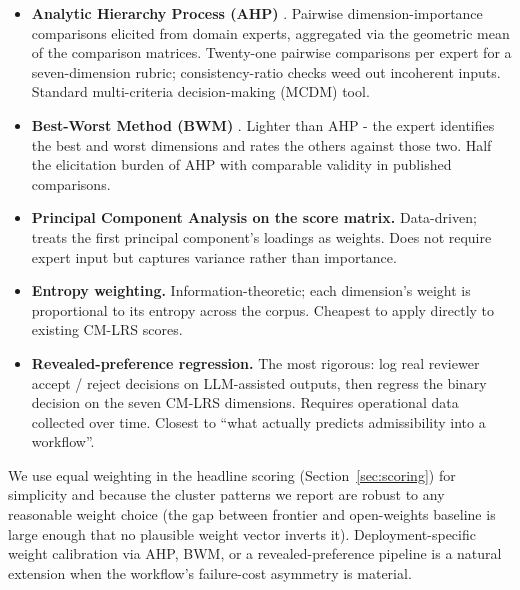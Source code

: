 \documentclass[11pt]{article}
\begin{document}
\begin{itemize}[leftmargin=*,itemsep=0.15em]
\item \textbf{Analytic Hierarchy Process (AHP)} \citep{saaty1980ahp}. Pairwise dimension-importance comparisons elicited from domain experts, aggregated via the geometric mean of the comparison matrices. Twenty-one pairwise comparisons per expert for a seven-dimension rubric; consistency-ratio checks weed out incoherent inputs. Standard multi-criteria decision-making (MCDM) tool.
\item \textbf{Best-Worst Method (BWM)} \citep{rezaei2015bwm}. Lighter than AHP - the expert identifies the best and worst dimensions and rates the others against those two. Half the elicitation burden of AHP with comparable validity in published comparisons.
\item \textbf{Principal Component Analysis on the score matrix.} Data-driven; treats the first principal component's loadings as weights. Does not require expert input but captures variance rather than importance.
\item \textbf{Entropy weighting.} Information-theoretic; each dimension's weight is proportional to its entropy across the corpus. Cheapest to apply directly to existing CM-LRS scores.
\item \textbf{Revealed-preference regression.} The most rigorous: log real reviewer accept / reject decisions on LLM-assisted outputs, then regress the binary decision on the seven CM-LRS dimensions. Requires operational data collected over time. Closest to ``what actually predicts admissibility into a workflow''.
\end{itemize}

We use equal weighting in the headline scoring (Section~\ref{sec:scoring}) for simplicity and because the cluster patterns we report are robust to any reasonable weight choice (the gap between frontier and open-weights baseline is large enough that no plausible weight vector inverts it). Deployment-specific weight calibration via AHP, BWM, or a revealed-preference pipeline is a natural extension when the workflow's failure-cost asymmetry is material.
\end{document}
